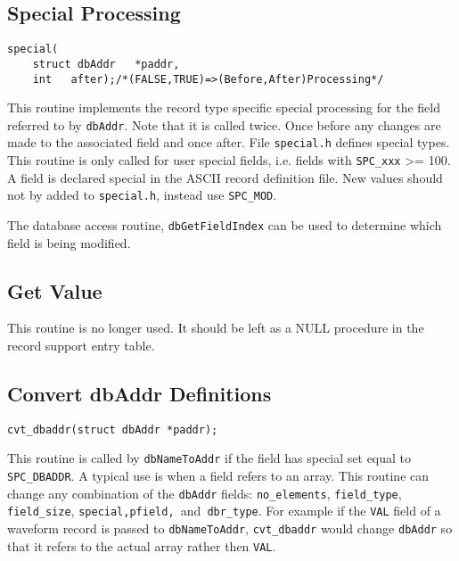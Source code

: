 \subsection{Special Processing}

\begin{verbatim}
special(
    struct dbAddr   *paddr,
    int   after);/*(FALSE,TRUE)=>(Before,After)Processing*/
\end{verbatim}

This routine implements the record type specific special processing for the field referred to by \verb|dbAddr|.
Note that it is called twice.
Once before any changes are made to the associated field and once after.
File \verb|special.h| defines special types.
This routine is only called for user special fields, i.e. fields with \verb|SPC_xxx| \textgreater{}= 100.
A field is declared special in the ASCII record definition file.
New values should not by added to \verb|special.h|, instead use \verb|SPC_MOD|.

The database access routine, \verb|dbGetFieldIndex| can be used to determine which field is being modified.

\subsection{Get Value}

This routine is no longer used.
It should be left as a NULL procedure in the record support entry table.

\subsection{Convert dbAddr Definitions}

\begin{verbatim}
cvt_dbaddr(struct dbAddr *paddr);
\end{verbatim}

This routine is called by \verb|dbNameToAddr| if the field has special set equal to \verb|SPC_DBADDR|.
A typical use is when a field refers to an array.
This routine can change any combination of the \verb|dbAddr| fields:
\verb|no_elements|, \verb|field_type|, \verb|field_size|, \verb|special,pfield, |and\verb| dbr_type|.
For example if the \verb|VAL| field of a waveform record is passed to \verb|dbNameToAddr|, \verb|cvt_dbaddr| would change \verb|dbAddr| so that it refers to the actual array rather then \verb|VAL|.

